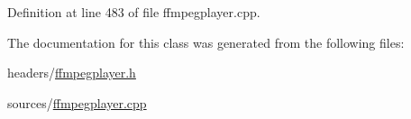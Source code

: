 Definition at line 483 of file ffmpegplayer.\+cpp.



The documentation for this class was generated from the following files\+:\begin{DoxyCompactItemize}
\item 
headers/\hyperlink{ffmpegplayer_8h}{ffmpegplayer.\+h}\item 
sources/\hyperlink{ffmpegplayer_8cpp}{ffmpegplayer.\+cpp}\end{DoxyCompactItemize}
